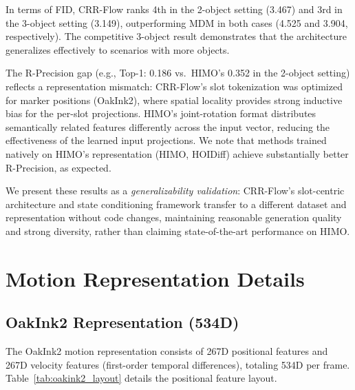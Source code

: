 \documentclass[sigconf, screen, review, anonymous]{acmart}
\begin{document}
In terms of FID, CRR-Flow ranks 4th in the 2-object setting (3.467) and 3rd in the 3-object setting (3.149), outperforming MDM in both cases (4.525 and 3.904, respectively). The competitive 3-object result demonstrates that the architecture generalizes effectively to scenarios with more objects.

The R-Precision gap (e.g., Top-1: 0.186 vs.\ HIMO's 0.352 in the 2-object setting) reflects a representation mismatch: CRR-Flow's slot tokenization was optimized for marker positions (OakInk2), where spatial locality provides strong inductive bias for the per-slot projections. HIMO's joint-rotation format distributes semantically related features differently across the input vector, reducing the effectiveness of the learned input projections. We note that methods trained natively on HIMO's representation (HIMO, HOIDiff) achieve substantially better R-Precision, as expected.

We present these results as a \emph{generalizability validation}: CRR-Flow's slot-centric architecture and state conditioning framework transfer to a different dataset and representation without code changes, maintaining reasonable generation quality and strong diversity, rather than claiming state-of-the-art performance on HIMO.


\section{Motion Representation Details}
\label{sec:representation}

\subsection{OakInk2 Representation (534D)}

The OakInk2 motion representation consists of 267D positional features and 267D velocity features (first-order temporal differences), totaling 534D per frame. Table~\ref{tab:oakink2_layout} details the positional feature layout.
\end{document}
